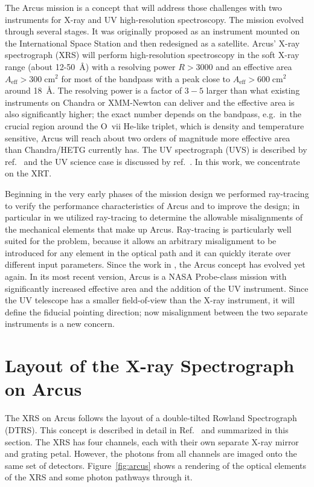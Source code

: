 \documentclass[12pt]{spieman}  %
\begin{document}
\begin{spacing}{1}
The Arcus mission is a concept that will address those challenges with two instruments for X-ray and UV high-resolution spectroscopy. The mission evolved through several stages. It was originally
proposed as an instrument mounted on the International Space Station\cite{10.1117/12.2062671} and then redesigned as a satellite\cite{10.1117/12.2231778,10.1117/12.2272818}. Arcus' X-ray spectrograph (XRS) will perform
high-resolution spectroscopy in the soft X-ray range (about 12-50~\AA{}) with a resolving power $R>3000$ and an effective area $A_\textrm{eff}>
300\;\mathrm{cm}^2$ for most of the bandpass with a peak close to $A_\textrm{eff} > 600\;\mathrm{cm}^2$ around 18~\AA{}. The resolving power is a factor of
$3-5$ larger than what existing instruments on Chandra or XMM-Newton can
deliver and the effective area is also significantly higher; the exact number
depends on the bandpass, e.g.\ in the crucial region around the O~{\sc vii}
He-like triplet, which is density and temperature sensitive, Arcus will reach
about two orders of magnitude more effective area than Chandra/HETG currently
has. The UV spectrograph (UVS) is described by ref.~ and the UV science case is discussed by ref.~. In this work, we concentrate on the XRT.

Beginning in the very early phases of the mission design we performed
ray-tracing to verify the performance characteristics of Arcus and to
improve the design\cite{10.1117/12.2232157}; in particular in  we utilized ray-tracing to determine the allowable misalignments of the mechanical elements that make up Arcus. Ray-tracing is particularly well suited for the problem, because it allows an arbitrary misalignment to be introduced for any element in the optical path and it can quickly iterate over different input parameters. Since the work in , the Arcus concept has evolved yet again. In its most recent version, Arcus is a NASA Probe-class mission with significantly increased effective area and the addition of the UV instrument. Since the UV telescope has a smaller field-of-view than the X-ray instrument, it will define the fiducial pointing direction; now misalignment between the two separate instruments is a new concern.


\section{Layout of the X-ray Spectrograph on Arcus}
The XRS on Arcus follows the layout of a double-tilted Rowland Spectrograph (DTRS). This concept is described in detail in Ref.~ and summarized in this section. The XRS has four channels, each with their own separate X-ray mirror and grating petal. However, the photons from all channels are imaged onto the same set of detectors. Figure~\ref{fig:arcus} shows a rendering of the optical elements of the XRS and some photon pathways through it.


\end{spacing}
\end{document}
